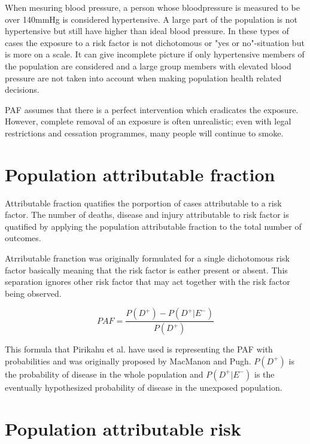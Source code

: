 When mesuring blood pressure, a person whose bloodpressure is measured to be over 140mmHg is considered hypertensive. A large part of the population is not hypertensive but still have higher than ideal blood pressure. In these types of cases the exposure to a risk factor is not dichotomous or "yes or no"-situation but is more on a scale. It can give incomplete picture if only hypertensive members of the population are considered and a large group members with elevated blood pressure are not taken into account when making population health related decisions.\cite{WHO2009GlobalHealthRisks}


PAF assumes that there is a perfect intervention which eradicates the exposure. However, complete removal of an exposure is often unrealistic; even with legal restrictions and cessation programmes, many people will continue to smoke.\cite{mansournia2018population}

\section{Population attributable fraction}\label{PopulationAttributableFraction}

Attributable fraction quatifies the porportion of cases attributable to a risk factor. \cite{DiMaso2020AttributableFF} The number of deaths, disease and injury attributable to risk factor is quatified by applying the population attributable fraction to the total number of outcomes. \cite{WHO2009GlobalHealthRisks}

Atrributable franction was originally formulated for a single dichotomous risk factor basically meaning that the risk factor is eather present or absent. This separation ignores other risk factor that may act together with the risk factor being observed. \cite{DiMaso2020AttributableFF}

\begin{equation} \label{PARequation}
    PAF = \frac{P(D^+) - P(D^+| E^-)}{P(D^+)}
\end{equation} \cite{Pirikahu2016BayesianMO}

This formula that Pirikahu et al. have used is representing the PAF with probabilities and was originally proposed by MacManon and Pugh.\cite{DiMaso2020AttributableFF} $P(D^+)$ is the probability of disease in the whole population and $P(D^+| E^-)$ is the eventually hypothesized probability of disease in the unexposed population.\cite{Drescher1991AttributableRE}

\section{Population attributable risk}\label{PopulationAttributableRisk}

